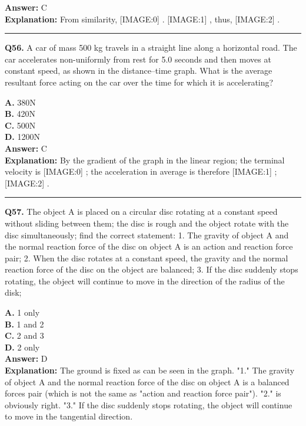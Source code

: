 \documentclass[12pt]{article}
\begin{document}
\textbf{Answer:} C \\
\textbf{Explanation:} From similarity,
[IMAGE:0]
.
[IMAGE:1]
, thus,
[IMAGE:2]
.

\hrule
\vspace{1em}


\noindent
\textbf{Q56.} A car of mass 500 kg travels in a straight line along a horizontal road.
The car accelerates non-uniformly from rest for 5.0 seconds and then moves at constant speed, as shown in the distance–time graph.
What is the average resultant force acting on the car over the time for which it is accelerating?



\textbf{A.} 380N \\
\textbf{B.} 420N \\
\textbf{C.} 500N \\
\textbf{D.} 1200N \\

\textbf{Answer:} C \\
\textbf{Explanation:} By the gradient of the graph in the linear region; the terminal velocity is
[IMAGE:0]
; the acceleration in average is therefore
[IMAGE:1]
;
[IMAGE:2]
.

\hrule
\vspace{1em}


\noindent
\textbf{Q57.} The object A is placed on a circular disc rotating at a constant speed without sliding between them; the disc is rough and the object rotate with the disc simultaneously; find the correct statement:
1.
The gravity of object A and the normal reaction force of the disc on object A is an action and reaction force pair;
2.
When the disc rotates at a constant speed, the gravity and the normal reaction force of the disc on the object are balanced;
3.
If the disc suddenly stops rotating, the object will continue to move in the direction of the radius of the disk;



\textbf{A.} 1 only \\
\textbf{B.} 1 and 2 \\
\textbf{C.} 2 and 3 \\
\textbf{D.} 2 only \\

\textbf{Answer:} D \\
\textbf{Explanation:} The ground is fixed as can be seen in the graph. "1." The gravity of object A and the normal reaction force of the disc on object A is a balanced forces pair (which is not the same as "action and reaction force pair"). "2." is obviously right. "3." If the disc suddenly stops rotating, the object will continue to move in the tangential direction.
\end{document}
